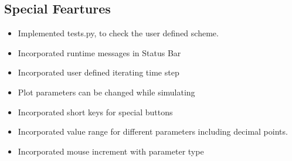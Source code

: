 \documentclass{beamer}
\begin{document}
\subsection{Special Feartures}
\begin{frame}
\begin{itemize}
\item	Implemented tests.py, to check the user defined scheme.
\item	Incorporated runtime messages in Status Bar
\item	Incorporated user defined iterating time step
\item	Plot parameters can be changed while simulating
\item	Incorporated short keys for special buttons
\item	Incorporated value range for different parameters including decimal points.
\item	Incorporated mouse increment with parameter type
\end{itemize}

\end{frame}

\end{document}
